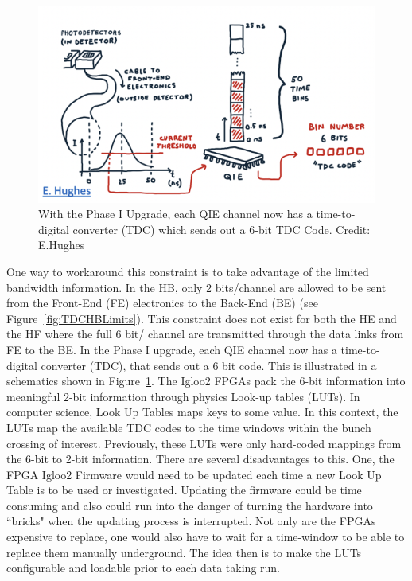 \begin{figure}[tbp!]
\begin{center}
\includegraphics[scale=1.2]{fig/TDCCode.png}
\end{center}
\caption{With the Phase I Upgrade, each QIE channel now has a time-to-digital converter (TDC) which sends out a 6-bit TDC Code. Credit: E.Hughes}
\label{fig:L1TriggerSketch}
\end{figure}

One way to workaround this constraint is to take advantage of the limited bandwidth information. In the HB, only 2 bits/channel are allowed to be sent from the Front-End (FE) electronics to the Back-End (BE) (see Figure~\ref{fig:TDCHBLimits}). This constraint does not exist for both the HE and the HF where the full 6 bit/ channel are transmitted through the data links from FE to the BE. In the Phase I upgrade, each QIE channel now has a time-to-digital converter (TDC), that sends out a 6 bit code.  This is illustrated in a schematics shown in Figure~\ref{fig:L1TriggerSketch}. The Igloo2 FPGAs pack the 6-bit information into meaningful 2-bit information through physics Look-up tables (LUTs). In computer science, Look Up Tables maps keys to some value. In this context, the LUTs map the available TDC codes to the time windows within the bunch crossing of interest. Previously, these LUTs were only hard-coded mappings from the 6-bit to 2-bit information. There are several disadvantages to this. One, the FPGA Igloo2 Firmware would need to be updated each time a new Look Up Table is to be used or investigated. Updating the firmware could be time consuming and also could run into the danger of turning the hardware into ``bricks" when the updating process is interrupted. Not only are the FPGAs expensive to replace, one would also have to wait for a time-window to be able to replace them manually underground. The idea then is to make the LUTs configurable and loadable prior to each data taking run. 

